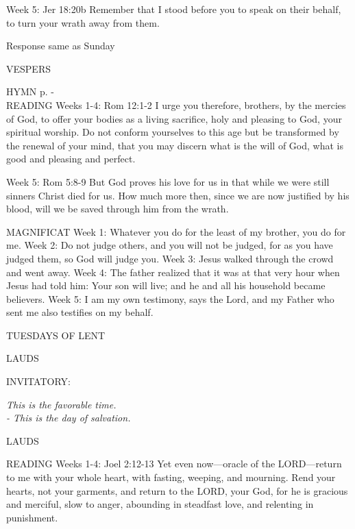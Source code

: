 Week 5:    Jer 18:20b    Remember that I stood before you to speak on their behalf, to turn your wrath away from them.

Response same as Sunday

\begin{flushleft}\normalsize{\uppercase{VESPERS\\}}\end{flushleft}
\small{\uppercase{HYMN} p. \pageref{lent:firstHymn}-\pageref{lent:lastHymn}\\}
READING
Weeks 1-4:     Rom 12:1-2     I urge you therefore, brothers, by the mercies of God, to offer your bodies as a living sacrifice, holy and pleasing to God, your spiritual worship. Do not conform yourselves to this age but be transformed by the renewal of your mind, that you may discern what is the will of God, what is good and pleasing and perfect.

Week 5:     Rom 5:8-9     But God proves his love for us in that while we were still sinners Christ died for us. How much more then, since we are now justified by his blood, will we be saved through him from the wrath.

MAGNIFICAT
Week 1:	Whatever you do for the least of my brother, you do for me.
Week 2:	Do not judge others, and you will not be judged, for as you have judged them, so God will judge you.
Week 3:	Jesus walked through the crowd and went away.
Week 4:	The father realized that it was at that very hour when Jesus had told him: Your son will live; and he and all his household became believers.
Week 5:	I am my own testimony, says the Lord, and my Father who sent me also testifies on my behalf.

	\begin{center}
\normalsize TUESDAYS OF LENT
	\end{center}

\begin{flushleft}\normalsize{\uppercase{LAUDS\\}}\end{flushleft}
\small{\uppercase{INVITATORY:}}\normalsize
\begin{center}
\textit{This is the favorable time.\\}
\textit{- This is the day of salvation.\\}
\end{center}
\begin{flushleft}\normalsize{\uppercase{LAUDS\\}}\end{flushleft}
READING
Weeks 1-4:    Joel 2:12-13    Yet even now—oracle of the LORD—return to me with your whole heart, with fasting, weeping, and mourning. Rend your hearts, not your garments, and return to the LORD, your God, for he is gracious and merciful, slow to anger, abounding in steadfast love, and relenting in punishment.

